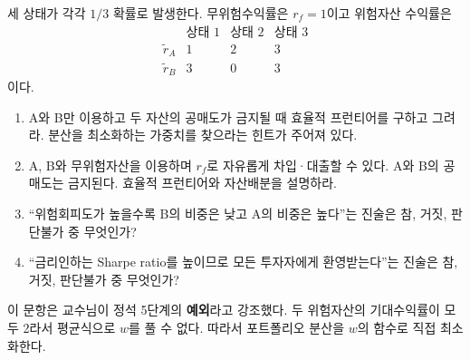 \begin{officialbox}
세 상태가 각각 $1/3$ 확률로 발생한다. 무위험수익률은 $r_f=1$이고 위험자산 수익률은
\[
\begin{array}{c|ccc}
&\text{상태 1}&\text{상태 2}&\text{상태 3}\\\hline
\widetilde r_A&1&2&3\\
\widetilde r_B&3&0&3
\end{array}
\]
이다.
\begin{enumerate}[label=(\alph*)]
\item A와 B만 이용하고 두 자산의 공매도가 금지될 때 효율적 프런티어를 구하고 그려라. 분산을 최소화하는 가중치를 찾으라는 힌트가 주어져 있다.
\item A, B와 무위험자산을 이용하며 $r_f$로 자유롭게 차입·대출할 수 있다. A와 B의 공매도는 금지된다. 효율적 프런티어와 자산배분을 설명하라.
\item ``위험회피도가 높을수록 B의 비중은 낮고 A의 비중은 높다''는 진술은 참, 거짓, 판단불가 중 무엇인가?
\item ``금리인하는 Sharpe ratio를 높이므로 모든 투자자에게 환영받는다''는 진술은 참, 거짓, 판단불가 중 무엇인가?
\end{enumerate}
\end{officialbox}

\begin{strategybox}
이 문항은 교수님이 정석 5단계의 \textbf{예외}라고 강조했다. 두 위험자산의 기대수익률이 모두 2라서 평균식으로 $w$를 풀 수 없다. 따라서 포트폴리오 분산을 $w$의 함수로 직접 최소화한다.
\end{strategybox}

